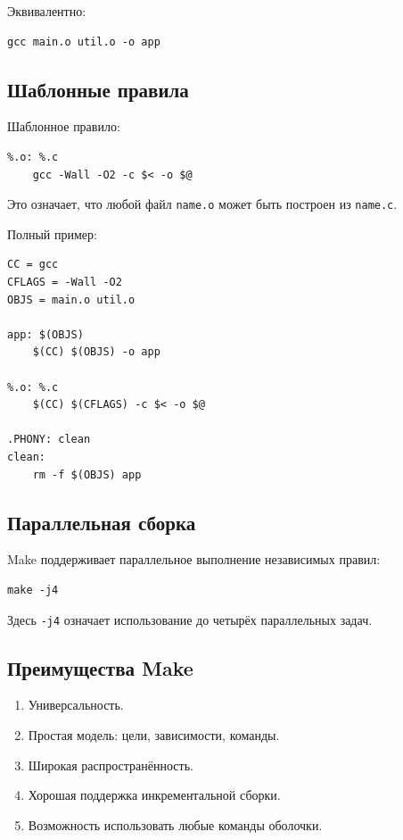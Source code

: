 \documentclass[12pt,a4paper]{article}
\begin{document}
Эквивалентно:

\begin{lstlisting}
gcc main.o util.o -o app
\end{lstlisting}

\subsection{Шаблонные правила}

Шаблонное правило:

\begin{lstlisting}
%.o: %.c
	gcc -Wall -O2 -c $< -o $@
\end{lstlisting}

Это означает, что любой файл \texttt{name.o} может быть построен из \texttt{name.c}.

Полный пример:

\begin{lstlisting}
CC = gcc
CFLAGS = -Wall -O2
OBJS = main.o util.o

app: $(OBJS)
	$(CC) $(OBJS) -o app

%.o: %.c
	$(CC) $(CFLAGS) -c $< -o $@

.PHONY: clean
clean:
	rm -f $(OBJS) app
\end{lstlisting}

\subsection{Параллельная сборка}

Make поддерживает параллельное выполнение независимых правил:

\begin{lstlisting}
make -j4
\end{lstlisting}

Здесь \texttt{-j4} означает использование до четырёх параллельных задач.

\subsection{Преимущества Make}

\begin{enumerate}
    \item Универсальность.
    \item Простая модель: цели, зависимости, команды.
    \item Широкая распространённость.
    \item Хорошая поддержка инкрементальной сборки.
    \item Возможность использовать любые команды оболочки.
\end{enumerate}
\end{document}
